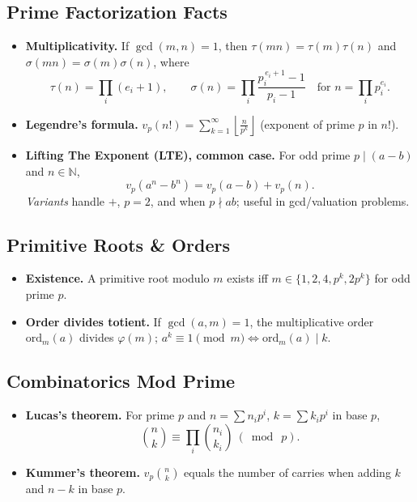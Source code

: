 \documentclass[10pt]{article}
\theoremstyle{definition}
\begin{document}
\subsection{Prime Factorization Facts}
\begin{itemize}
  \item \textbf{Multiplicativity.} If $\gcd(m,n)=1$, then $\tau(mn)=\tau(m)\tau(n)$ and $\sigma(mn)=\sigma(m)\sigma(n)$, where
  \[
    \tau(n)=\prod_{i}(e_i+1),\qquad
    \sigma(n)=\prod_{i}\frac{p_i^{\,e_i+1}-1}{p_i-1}\quad\text{for } n=\prod_i p_i^{e_i}.
  \]
  \item \textbf{Legendre's formula.} $v_p(n!)=\displaystyle\sum_{k=1}^{\infty}\left\lfloor \frac{n}{p^k}\right\rfloor$ (exponent of prime $p$ in $n!$).
  \item \textbf{Lifting The Exponent (LTE), common case.} For odd prime $p\mid (a-b)$ and $n\in\mathbb{N}$,
  \[
    v_p(a^n-b^n)=v_p(a-b)+v_p(n).
  \]
  \emph{Variants} handle $+$, $p=2$, and when $p\nmid ab$; useful in gcd/valuation problems.
\end{itemize}

\subsection{Primitive Roots \& Orders}
\begin{itemize}
  \item \textbf{Existence.} A primitive root modulo $m$ exists iff $m\in\{1,2,4,p^k,2p^k\}$ for odd prime $p$.
  \item \textbf{Order divides totient.} If $\gcd(a,m)=1$, the multiplicative order $\mathrm{ord}_m(a)$ divides $\varphi(m)$; $a^k\equiv 1\pmod m \iff \mathrm{ord}_m(a)\mid k$.
\end{itemize}

\subsection{Combinatorics Mod Prime}
\begin{itemize}
  \item \textbf{Lucas's theorem.} For prime $p$ and $n=\sum n_i p^i$, $k=\sum k_i p^i$ in base $p$,
  \[
    \binom{n}{k}\equiv \prod_i \binom{n_i}{k_i}\ (\bmod\ p).
  \]
  \item \textbf{Kummer's theorem.} $v_p\!\binom{n}{k}$ equals the number of carries when adding $k$ and $n-k$ in base $p$.
\end{itemize}
\end{document}
